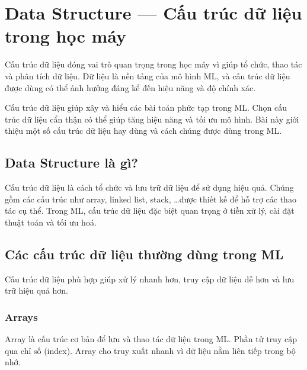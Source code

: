 \section{Data Structure --- Cấu trúc dữ liệu trong học máy}

\begin{dongco}[title={Vì sao cấu trúc dữ liệu quan trọng trong ML?}]
Cấu trúc dữ liệu đóng vai trò quan trọng trong học máy vì giúp tổ chức, thao tác và phân tích dữ liệu.
Dữ liệu là nền tảng của mô hình ML, và cấu trúc dữ liệu được dùng có thể ảnh hưởng đáng kể đến hiệu năng và độ chính xác.
\end{dongco}

\begin{ynghia}[title={target của bài}]
Cấu trúc dữ liệu giúp xây và hiểu các bài toán phức tạp trong ML.
Chọn cấu trúc dữ liệu cẩn thận có thể giúp tăng hiệu năng và tối ưu mô hình.
Bài này giới thiệu một số cấu trúc dữ liệu hay dùng và cách chúng được dùng trong ML.
\end{ynghia}

\subsection{Data Structure là gì?}

\begin{dinhnghia}[title={Định nghĩa}]
Cấu trúc dữ liệu là cách tổ chức và lưu trữ dữ liệu để sử dụng hiệu quả.
Chúng gồm các cấu trúc như array, linked list, stack, \ldots được thiết kế để hỗ trợ các thao tác cụ thể.
Trong ML, cấu trúc dữ liệu đặc biệt quan trọng ở tiền xử lý, cài đặt thuật toán và tối ưu hoá.
\end{dinhnghia}

\subsection{Các cấu trúc dữ liệu thường dùng trong ML}

\begin{dongco}[title={Chọn đúng cấu trúc giúp làm nhanh và tiết kiệm bộ nhớ}]
Cấu trúc dữ liệu phù hợp giúp xử lý nhanh hơn, truy cập dữ liệu dễ hơn và lưu trữ hiệu quả hơn.
\end{dongco}

\subsubsection{Arrays}
\begin{dinhnghia}[title={Arrays}]
Array là cấu trúc cơ bản để lưu và thao tác dữ liệu trong ML.
Phần tử truy cập qua chỉ số (index). Array cho truy xuất nhanh vì dữ liệu nằm liên tiếp trong bộ nhớ.
\end{dinhnghia}

